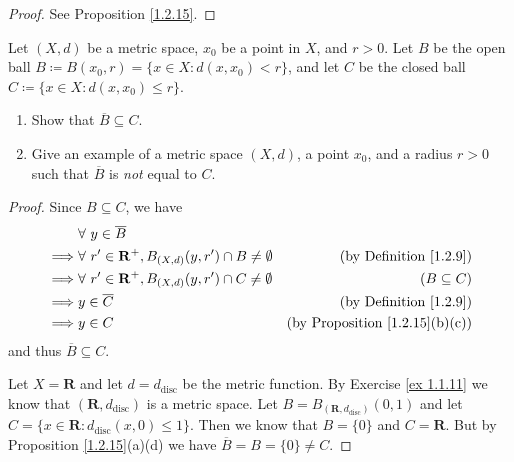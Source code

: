 \begin{proof}
    See Proposition \ref{1.2.15}.
\end{proof}

\begin{exercise}\label{ex 1.2.4}
    Let \((X, d)\) be a metric space, \(x_0\) be a point in \(X\), and \(r > 0\).
    Let \(B\) be the open ball \(B \coloneqq B(x_0, r) = \{x \in X : d(x, x_0) < r\}\), and let \(C\) be the closed ball \(C \coloneqq \{x \in X : d(x, x_0) \leq r\}\).
    \begin{enumerate}
        \item Show that \(\overline{B} \subseteq C\).
        \item Give an example of a metric space \((X, d)\), a point \(x_0\), and a radius \(r > 0\) such that \(\overline{B}\) is \emph{not} equal to \(C\).
    \end{enumerate}
\end{exercise}

\begin{proof}
    Since \(B \subseteq C\), we have
    \begin{align*}
                 & \forall\ y \in \overline{B}                                                                                        \\
        \implies & \forall\ r' \in \mathbf{R}^+, B_{(X, d)}(y, r') \cap B \neq \emptyset & \text{(by Definition \ref{1.2.9})}         \\
        \implies & \forall\ r' \in \mathbf{R}^+, B_{(X, d)}(y, r') \cap C \neq \emptyset & (B \subseteq C)                            \\
        \implies & y \in \overline{C}                                                    & \text{(by Definition \ref{1.2.9})}         \\
        \implies & y \in C                                                               & \text{(by Proposition \ref{1.2.15}(b)(c))}
    \end{align*}
    and thus \(\overline{B} \subseteq C\).

    Let \(X = \mathbf{R}\) and let \(d = d_{\text{disc}}\) be the metric function.
    By Exercise \ref{ex 1.1.11} we know that \((\mathbf{R}, d_{\text{disc}})\) is a metric space.
    Let \(B = B_{(\mathbf{R}, d_{\text{disc}})}(0, 1)\) and let \(C = \{x \in \mathbf{R} : d_{\text{disc}}(x, 0) \leq 1\}\).
    Then we know that \(B = \{0\}\) and \(C = \mathbf{R}\).
    But by Proposition \ref{1.2.15}(a)(d) we have \(\overline{B} = B = \{0\} \neq C\).
\end{proof}